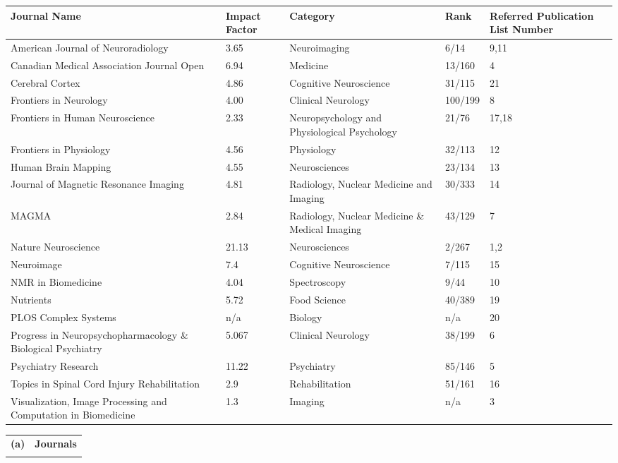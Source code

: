 \documentclass[11pt,notitlepage,english]{report}
\begin{document}
\begin{longtable}{| L{5cm} | L{2cm} | L{3.5cm} | L{2.5cm} | L{2.5cm} |}
  \hline
  \textbf{Journal Name}    & \textbf{Impact Factor} & \textbf{Category} & \textbf{Rank} & \textbf{Referred Publication List Number} \\
  \hline
  American Journal of Neuroradiology & 3.65 & Neuroimaging & 6/14 & 9,11 \\
  \hline
  Canadian Medical Association Journal Open & 6.94 & Medicine & 13/160 & 4 \\
  \hline
  Cerebral Cortex & 4.86 & Cognitive Neuroscience & 31/115 & 21 \\
  \hline
  Frontiers in Neurology & 4.00 & Clinical Neurology & 100/199 & 8 \\
  \hline
  Frontiers in Human Neuroscience & 2.33 & Neuropsychology and Physiological Psychology & 21/76 & 17,18 \\
  \hline
  Frontiers in Physiology & 4.56 & Physiology & 32/113 & 12 \\
  \hline
  Human Brain Mapping & 4.55 & Neurosciences & 23/134 & 13 \\
  \hline
  Journal of Magnetic Resonance Imaging & 4.81 & Radiology, Nuclear Medicine and Imaging & 30/333 & 14 \\
  \hline
  MAGMA & 2.84 & Radiology, Nuclear Medicine \& Medical Imaging & 43/129 & 7 \\
  \hline
  Nature Neuroscience & 21.13 & Neurosciences & 2/267 & 1,2 \\
  \hline
  Neuroimage & 7.4 & Cognitive Neuroscience & 7/115 & 15 \\
  \hline
  NMR in Biomedicine & 4.04 & Spectroscopy & 9/44 & 10 \\
  \hline
  Nutrients & 5.72 & Food Science & 40/389 & 19\\ 
  \hline
  PLOS Complex Systems & n/a & Biology & n/a & 20 \\
  \hline
  Progress in Neuropsychopharmacology \& Biological Psychiatry & 5.067 & Clinical Neurology & 38/199 & 6 \\
  \hline
  Psychiatry Research & 11.22 & Psychiatry & 85/146 & 5 \\
  \hline
  Topics in Spinal Cord Injury Rehabilitation & 2.9 & Rehabilitation & 51/161 & 16 \\
  \hline
  Visualization, Image Processing and Computation in Biomedicine & 1.3 & Imaging & n/a & 3
  \hline
\end{longtable}

\begin{tabular}{L{.5cm} L{18.9cm} }
  \label{Journal_Publications}
  \\
  \textbf{(a)}  & \textbf{Journals}                                      \\
  \\
\end{tabular}
\end{document}
